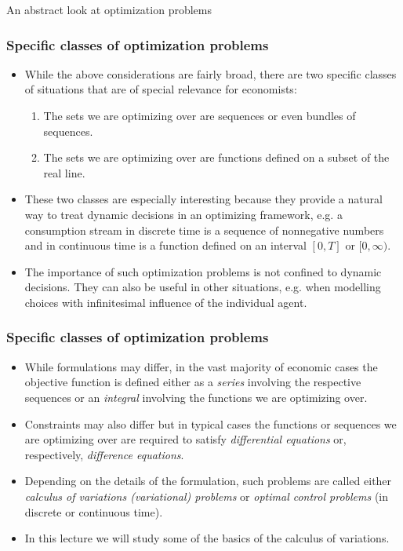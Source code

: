 \documentclass[10pt]{beamer}
\theoremstyle{definition}
\begin{document}
\begin{section}{An abstract look at optimization problems}
\begin{frame}[fragile]
\frametitle{Specific classes of optimization problems}
\begin{itemize}\itemsep1em
\item While the above considerations are fairly broad, there are two specific classes of situations that are of special relevance for economists:
		\begin{enumerate}\itemsep1em
		\item The sets we are optimizing over are sequences or even bundles of sequences.
		\item The sets we are optimizing over are functions defined on a subset of the real line.
		\end{enumerate}
\item These two classes are especially interesting because they provide a natural way to treat dynamic decisions in an optimizing framework, e.g. a consumption stream in discrete time is a sequence of nonnegative numbers and in continuous time is a function defined on an interval $ [0,T] $ or $ [0,\infty) $.
\item The importance of such optimization problems is not confined to dynamic decisions. They can also be useful in other situations, e.g. when modelling choices with infinitesimal influence of the individual agent.
\end{itemize}
\end{frame}

\begin{frame}[fragile]
\frametitle{Specific classes of optimization problems}
\begin{itemize}\itemsep1em
\item While formulations may differ, in the vast majority of economic cases the objective function is defined either as a \emph{series} involving the respective sequences or an \emph{integral} involving the functions we are optimizing over.
\item Constraints may also differ but in typical cases the functions or sequences we are optimizing over are required to satisfy \emph{differential equations} or, respectively, \emph{difference equations}.
\item Depending on the details of the formulation, such problems are called either \emph{calculus of variations (variational) problems} or \emph{optimal control problems} (in discrete or continuous time).
\item In this lecture we will study some of the basics of the calculus of variations.
\end{itemize}
\end{frame}

\end{section}
\end{document}
